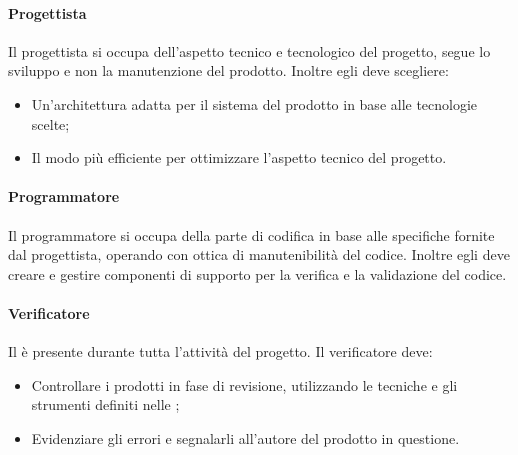 \paragraph{Progettista}
Il progettista si occupa dell'aspetto tecnico e tecnologico del progetto, segue lo sviluppo e non la manutenzione del prodotto. Inoltre egli deve scegliere: 
\begin{itemize}
\item Un'architettura adatta per il sistema del prodotto in base alle tecnologie scelte;
\item Il modo più efficiente per ottimizzare l'aspetto tecnico del progetto.
\end{itemize}

\paragraph{Programmatore}
Il programmatore si occupa della parte di codifica in base alle specifiche fornite dal progettista, operando con ottica di manutenibilità del codice. Inoltre egli deve creare e gestire componenti di supporto per la verifica e la validazione del codice. 

\paragraph{Verificatore}
Il  è presente durante tutta l'attività del progetto. Il verificatore deve: 
\begin{itemize}
\item Controllare i prodotti in fase di revisione, utilizzando le tecniche e gli strumenti definiti nelle ; 
\item Evidenziare gli errori e segnalarli all'autore del prodotto in questione.
\end{itemize}
